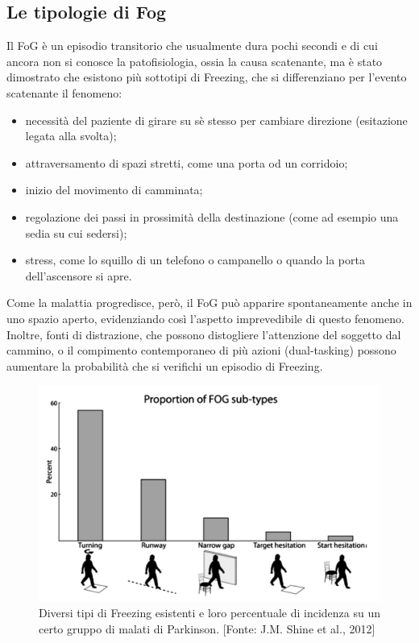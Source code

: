 \subsection{Le tipologie di Fog}
Il FoG è un episodio transitorio che usualmente dura pochi secondi e di cui ancora non si conosce la patofisiologia, ossia la causa scatenante, ma è stato dimostrato che esistono più sottotipi di Freezing, che si differenziano per l'evento scatenante il fenomeno:
\begin{itemize}
	\item necessità del paziente di girare su sè stesso per cambiare direzione (esitazione legata alla svolta);
	\item attraversamento di spazi stretti, come una porta od un corridoio;
	\item inizio del movimento di camminata;
	\item regolazione dei passi in prossimità della destinazione (come ad esempio una sedia su cui sedersi);
	\item stress, come lo squillo di un telefono o campanello o quando la porta dell'ascensore si apre.
\end{itemize}
Come la malattia progredisce, però, il FoG può apparire spontaneamente anche in uno spazio aperto, evidenziando così l’aspetto imprevedibile di questo fenomeno. Inoltre, fonti di distrazione, che possono distogliere l’attenzione del soggetto dal cammino, o il compimento contemporaneo di più azioni (dual-tasking) possono aumentare la probabilità che si verifichi un episodio di Freezing.\\
\begin{figure}[]
	\centering
	\includegraphics[scale=0.4]{images/Proportion_of_FOG_sub-types.png}
	\caption{Diversi tipi di Freezing esistenti e loro percentuale di incidenza su un certo gruppo di malati di Parkinson. [Fonte: J.M. Shine et al., 2012]}
\end{figure}

